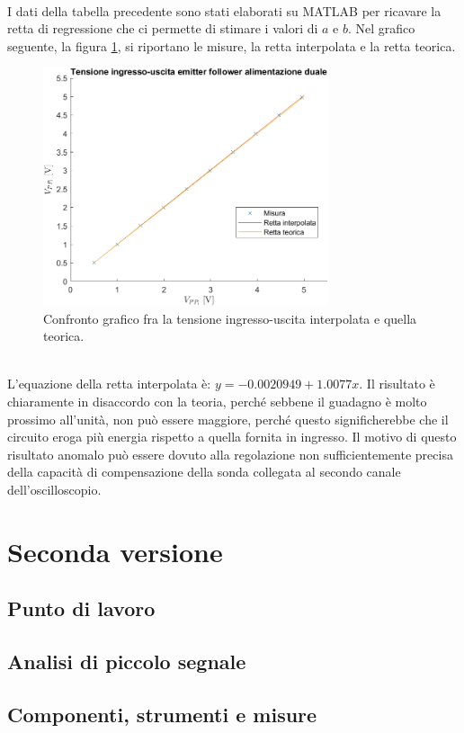 \documentclass{report}
\begin{document}
\\I dati della tabella precedente sono stati elaborati su MATLAB per ricavare la retta di regressione che ci permette di stimare i valori di $a$ e $b$. Nel grafico seguente, la figura \ref{figura:graficoEFv1}, si riportano le misure, la retta interpolata e la retta teorica. 
\begin{figure}[h]
\centering
\includegraphics[height=7cm]{immagini/graficoEFv1}
\caption{Confronto grafico fra la tensione ingresso-uscita interpolata e quella teorica.}
\label{figura:graficoEFv1}
\end{figure}
\\L'equazione della retta interpolata è: $y=-0.0020949+1.0077x$. Il risultato è chiaramente in disaccordo con la teoria, perché sebbene il guadagno è molto prossimo all'unità, non può essere maggiore, perché questo significherebbe che il circuito eroga più energia rispetto a quella fornita in ingresso. Il motivo di questo risultato anomalo può essere dovuto alla regolazione non sufficientemente precisa della capacità di compensazione della sonda collegata al secondo canale dell'oscilloscopio.
\section{Seconda versione} %
\subsection{Punto di lavoro} 
\subsection{Analisi di piccolo segnale}  %
\subsection{Componenti, strumenti e misure} 
\end{document}
